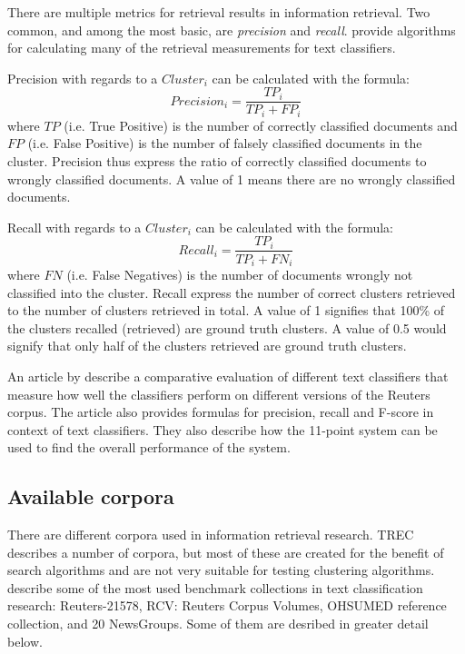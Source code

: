 There are multiple metrics for retrieval results in information retrieval. Two common, and among the most basic, are \textit{precision} and \textit{recall}. \cite{Sebastiani2002} provide algorithms for calculating many of the retrieval measurements for text classifiers.

Precision with regards to a \(Cluster_{i}\) can be calculated with the formula:
\begin{displaymath}
Precision_{i} = 
\frac{TP_{i}}{TP_{i} + FP_{i}}
\end{displaymath}
where \(TP\) (i.e. True Positive) is the number of correctly classified documents and \(FP\) (i.e. False Positive) is the number of falsely classified documents in the cluster. Precision thus express the ratio of correctly classified documents to wrongly classified documents. A value of 1 means there are no wrongly classified documents.

Recall with regards to a \(Cluster_{i}\) can be calculated with the formula: 
\begin{displaymath}
Recall_{i} = 
\frac{TP_{i}}{TP_{i} + FN_{i}}
\end{displaymath}
where \(FN\) (i.e. False Negatives) is the number of documents wrongly not classified into the cluster. Recall express the number of correct clusters retrieved to the number of clusters retrieved in total. A value of 1 signifies that 100\% of the clusters recalled (retrieved) are ground truth clusters. A value of 0.5 would signify that only half of the clusters retrieved are ground truth clusters.

An article by \cite{Yang1999} describe a comparative evaluation of different text classifiers that measure how well the classifiers perform on different versions of the Reuters corpus. The article also provides formulas for precision, recall and F-score in context of text classifiers. They also describe how the 11-point system can be used to find the overall performance of the system.


\subsection{Available corpora}
There are different corpora used in information retrieval research. TREC describes a number of corpora, but most of these are created for the benefit of search algorithms and are not very suitable for testing clustering algorithms. \citeauthor{Baeza-Yates2011a} describe some of the most used benchmark collections in text classification research: Reuters-21578, RCV: Reuters Corpus Volumes, OHSUMED reference collection, and 20 NewsGroups. Some of them are desribed in greater detail below.

